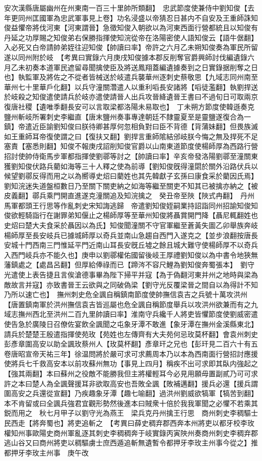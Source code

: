 安次漢縣唐屬幽州在州東南一百三十里帥所類翻】　忠武節度使兼侍中劉知俊【去年更同州匡國軍為忠武軍事見上卷】功名浸盛以帝猜忍日甚内不自安及王重師誅知俊益懼帝將伐河東【河東謂晉】急徵知俊入朝欲以為河東西面行營都統且以知俊有丹延之功厚賜之知俊弟右保勝指揮使知浣從帝在洛陽密使人語知俊云【語牛倨翻】入必死又白帝請帥弟姪往迎知俊【帥讀曰率】帝許之六月乙未朔知俊奏為軍民所留遂以同州附於岐　【考異曰實錄六月庚戌知俊據本郡反削奪官爵興師討伐編遺錄六月乙未初奏本道軍民遮留尋聞擒使臣及將送鳳翔蓋編遺據奏到之日實錄据削奪之日也】執監軍及將佐之不從者皆械送於岐遣兵襲華州逐刺史蔡敬思【九域志同州南至華州七十里華戶化翻】以兵守潼關濳遣人以重利㗖長安諸將【㗖徒濫翻】執劉捍送於岐殺之知俊遣使請兵於岐亦遣使請晉人出兵攻晉絳遺晉王書曰不過旬日可取兩京復唐社稷【遺唯季翻長安可以言取梁都洛陽未易取也】　丁未朔方節度使韓遜奏克鹽州斬岐所署刺史李繼直【唐末鹽州奏事專達朝廷不隸靈夏至是靈鹽遂復合為一鎮】帝遣近臣諭劉知俊曰朕待卿甚厚何忽相負對曰臣不背德【背蒲妹翻】但畏族滅如王重師耳帝復使謂之曰【復扶又翻】劉捍言重師隂結邠岐朕今悔之無及捍死不足塞責【塞悉則翻】知俊不報庚戌詔削知俊官爵以山南東道節度使楊師厚為西路行營招討使帥侍衛馬步軍都指揮使劉鄩等討之【帥讀曰率】辛亥帝發洛陽劉鄩至潼關東獲劉知俊伏路兵藺如海等三十人釋之使為前導【劉知俊旣得潼閟於關外沿路伏兵以候望劉鄩反得而用之以為嚮導史炤曰藺姓也其先韓獻子玄孫曰康食采於藺因氏焉】劉知浣迷失道盤桓數日乃至關下關吏納之如海等繼至關吏不知其已被擒亦納之【被皮義翻】鄩兵乘門開直進遂克潼關追及知浣擒之　癸丑帝至陜【陜式冉翻】　丹州馬軍都頭王行思等作亂刺史宋知誨逃歸　帝遣劉知俊姪嗣業持詔詣同州招諭知俊知俊欲輕騎詣行在謝罪弟知偃止之楊師厚等至華州知俊將聶賞開門降【聶尼輒翻姓也史炤曰楚大夫食采於聶因以為氏】知俊聞潼關不守官軍繼至蒼黃失圖乙卯舉族奔岐楊師厚至長安岐兵已據城師厚以奇兵並南山急趨自西門入遂克之【並步浪翻按唐長安城十門西南三門惟延平門近南山耳長安旣丘墟之餘且城大難守使楊師厚不以奇兵入西門岐兵亦不能久也】庚申以劉鄩權佑國留後岐王厚禮劉知俊以為中書令地狹無藩鎮處之【處昌呂翻】但厚給俸祿而已【蹄涔不容尺鯉為劉知俊奔蜀張本】　劉守光遣使上表告捷且言俟滄德事畢為陛下掃平并寇【為于偽翻河東并州之地時與梁為敵故言并寇】亦致書晉王云欲與之同破偽梁【劉守光反覆梁晉之間自以為得計不知乃所以速亡也】　撫州刺史危全諷自稱鎮南節度使帥撫信袁吉之兵號十萬攻洪州【唐置鎮南軍於洪州撫信袁吉皆巡屬也危全諷自稱節度舉兵以攻洪州欲兼而有之九域志撫州西北至洪州二百九里帥讀曰率】淮南守兵纔千人將吏皆懼節度使劉威密遣使告急於廣陵日召僚佐宴飲全諷聞之屯象牙潭不敢進【象牙潭在撫州金溪縣東北】請兵於楚楚王殷遣指揮使苑玫【苑姓也左傳齊有大夫苑何忌玫莫杯翻】會袁州刺史彭彥章圍高安以助全諷玫蔡州人【玫莫杯翻】彥章玕之兄也【彭玕見二百六十有五卷唐昭宣帝天祐三年】徐温問將於嚴可求可求薦周本乃以本為西南面行營招討應援使將兵七千救高安本以前攻蘇州無功【事見上四月】稱疾不出可求即其臥内強起之【強其兩翻】本曰蘇州之役敵不能勝我但主將權輕耳今必見用願毋置副貳乃可可求許之本曰楚人為全諷聲援耳非欲取高安也吾敗全諷【敗補邁翻】援兵必還【援兵謂圍高安之兵還從宣翻】乃疾趣象牙潭【趣七喻翻】過洪州劉威欲犒軍【犒苦到翻】本不肯留或曰全諷兵強君宜觀形勢然後進本曰賊衆十倍於我我軍聞之必懼不若乘其鋭而用之　秋七月甲子以劉守光為燕王　梁兵克丹州擒王行思　商州刺史李稠驅士民西走【將奔蜀也】將吏追斬之　【考異曰薛史稠弃郡西奔本州將吏以都牙校李玫權知州事歐陽史商州軍亂逐其刺史李稠稠奔于岐實錄丙寅陜州奏商州刺史李稠弃郡逃山谷又曰商州將吏以稠驅虜士庶西遁追斬無遺暫令都押牙李玫主州事今從之】推都押牙李玫主州事　庚午改